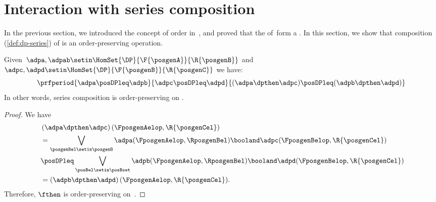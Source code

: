 
\section{Interaction with series composition}
In the previous section, we introduced the concept of order in~\DP, and proved that the  of~\DP form a .
In this section, we show that composition (\cref{def:dp-series}) of  is an order-preserving operation.

\begin{lemma}
    \label{lem:series_pres_order}
    Given~$\adpa,\adpab \setin \HomSet{\DP}{\F{\posgenA}}{\R{\posgenB}}$ and~$\adpc,\adpd \setin \HomSet{\DP}{\F{\posgenB}}{\R{\posgenC}}$ we have:
    \begin{equation}
        \prfperiod{
            \adpa\posDPleq \adpb
        }{
            \adpc\posDPleq \adpd
        }{
            (\adpa\dpthen \adpc) \posDPleq (\adpb\dpthen \adpd)
        }
    \end{equation}
    In other words, series composition is order-preserving on \DP.
\end{lemma}

\begin{proof}
    We have
    \begin{equation}
        \label{eq:series_pres_ord}
        \begin{aligned}
            ~ & \left( \adpa\dpthen \adpc\right)(\FposgenAelop,\R{\posgenCel}) \\
              & = \bigvee_{\posgenBel\setin \posgenB}\adpa(\FposgenAelop,\RposgenBel)\booland \adpc(\FposgenBelop,\R{\posgenCel}) \\
              & \posDPleq \bigvee_{\posBel\setin \posBset} \adpb(\FposgenAelop,\RposgenBel)\booland \adpd(\FposgenBelop,\R{\posgenCel}) \\
              & =\left( \adpb\dpthen \adpd\right)(\FposgenAelop,\R{\posgenCel}).
        \end{aligned}
    \end{equation}
    Therefore, $\fthen$ is order-preserving on~\DP.
\end{proof}

